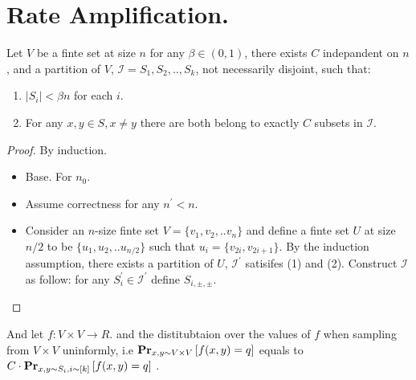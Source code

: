 \documentclass[manuscript,screen,review]{acmart}
\begin{document}
\section{Rate Amplification.}


\begin{claim}
  Let $V$ be a finte set at size $n$ for any $\beta \in (0,1)$, there exists $C$ indepandent on $n$, and a partition of $V$, $\mathcal{I} = S_{1},S_{2},..,S_{k}$, not necessarily disjoint, such that: 
  \begin{enumerate}
    \item $|S_{i}| < \beta n$ for each $i$.
    \item For any $x,y \in S, x\neq y$ there are both belong to exactly $C$ subsets in $\mathcal{I}$.
  \end{enumerate}
\end{claim}

\begin{proof}
  By induction.
  \begin{itemize}
      \item Base. For $n_{0}$. 
      \item Assume correctness for any $n^{\prime} < n$. 
      \item Consider an $n$-size finte set $V = \{ v_1, v_2 ,.. v_n\}$ and define a finte set $U$ at size $n/2$ to be $\{u_1, u_2, .. u_{n/2}\}$ such that $u_{i} = \{v_{2i}, v_{2i+1}\}$. By the induction assumption, there exists a partition of $U$, $\mathcal{I}^{\prime}$ satisifes (1) and (2). Construct $\mathcal{I}$ as follow: for any $S^{\prime}_{i} \in \mathcal{I}^{\prime}$ define $S_{i,\pm,\pm}$. 
  \end{itemize}
\end{proof}

\begin{corollary}
And let $ f : V \times V \rightarrow R$. and the distitubtaion over the values of $f$ when sampling from $V \times V$ uninformly, i.e $\prbm{ f(x,y) = q  }{x,y \sim V \times V}$  equals to $C \cdot \prbm{f(x,y) = q }{x,y \sim S_{i}, i\sim [k]}$ .
\end{corollary}


%
%
%
\end{document}
